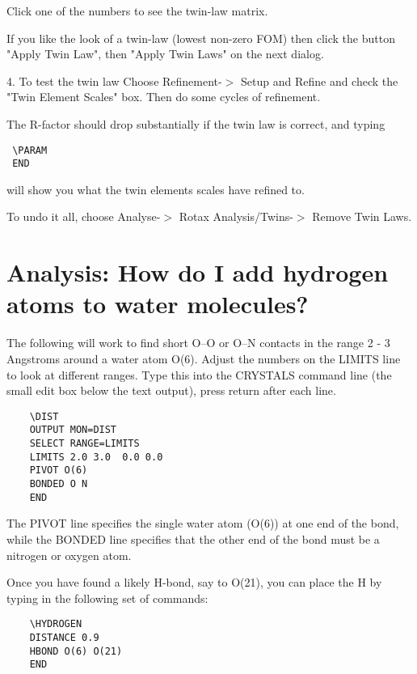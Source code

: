 \documentclass[10pt,a4paper]{report}
\begin{document}
    Click one of the numbers to see the twin-law matrix.


    If you like the look of a twin-law (lowest non-zero FOM) then click 
    the button "Apply Twin Law", then "Apply Twin Laws" on the next dialog.



 4. To test the twin law Choose Refinement-$>$ Setup and Refine and check
    the "Twin Element Scales" box. Then do some cycles of refinement.



    The R-factor should drop substantially if the twin law is correct,
    and typing
\small\begin{verbatim}
 \PARAM
 END
\end{verbatim}\normalsize


    will show you what the twin elements scales have refined to.



    To undo it all, choose Analyse-$>$ Rotax Analysis/Twins-$>$ Remove Twin
    Laws.



\section{Analysis: How do I add hydrogen atoms to water molecules?}


The following will work to find short O--O or O--N contacts
in the range 2 - 3 Angstroms around a water atom O(6). 
Adjust the numbers on the LIMITS line to look at different ranges. 
Type this into the CRYSTALS command line (the small edit box below
the text output), press return after each line.
\small\begin{verbatim}
    \DIST 
    OUTPUT MON=DIST 
    SELECT RANGE=LIMITS 
    LIMITS 2.0 3.0  0.0 0.0 
    PIVOT O(6)
    BONDED O N
    END
\end{verbatim}\normalsize


The PIVOT line specifies the single water atom (O(6)) at one end of
the bond, while the BONDED line specifies that the other end of the
bond must be a nitrogen or oxygen atom. 



Once you have found a likely H-bond, say to O(21), you can place the
H by typing in the following set of commands: 
\small\begin{verbatim}
    \HYDROGEN
    DISTANCE 0.9
    HBOND O(6) O(21)
    END
\end{verbatim}\normalsize
\end{document}
